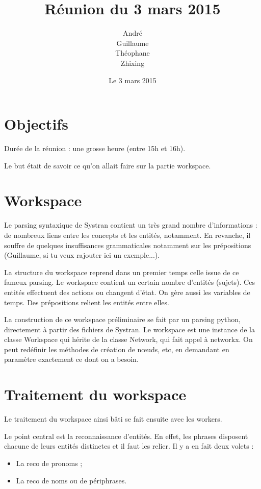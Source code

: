 \documentclass[a4paper,12pt]{article}
\title{Réunion du 3 mars 2015}
\author{André\\ Guillaume\\ Théophane\\ Zhixing } %
\date{Le 3 mars 2015}
\begin{document}
\titrecourt %

\section{Objectifs}

Durée de la réunion : une grosse heure (entre 15h et 16h).

Le but était de savoir ce qu'on allait faire sur la partie workspace.


\section{Workspace}

Le parsing syntaxique de Systran contient un très grand nombre d'informations : de nombreux liens entre les concepts et les entités, notamment. En revanche, il souffre de quelques insuffisances grammaticales notamment sur les prépositions (Guillaume, si tu veux rajouter ici un exemple...).

La structure du workspace reprend dans un premier temps celle issue de ce fameux parsing. Le workspace contient un certain nombre d'entités (sujets). Ces entités effectuent des actions ou changent d'état. On gère aussi les variables de temps. Des prépositions relient les entités entre elles.

La construction de ce workspace préliminaire se fait par un parsing python, directement à partir des fichiers de Systran. Le workspace est une instance de la classe Workspace qui hérite de la classe Network, qui fait appel à networkx. On peut redéfinir les méthodes de création de n\oe uds, etc, en demandant en paramètre exactement ce dont on a besoin.

\section{Traitement du workspace}

Le traitement du workspace ainsi bâti se fait ensuite avec les workers.

Le point central est la reconnaissance d'entités. En effet, les phrases disposent chacune de leurs entités distinctes et il faut les relier. Il y a en fait deux volets :
\begin{itemize}
 \item La reco de pronoms ;
 \item La reco de noms ou de périphrases.
\end{itemize}
\end{document}
